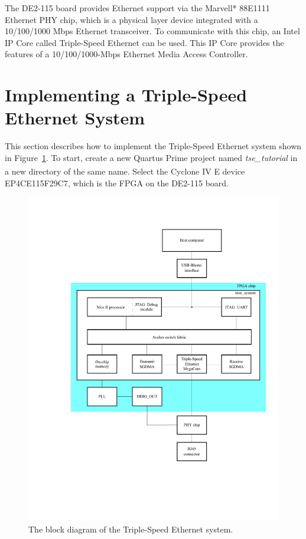 \documentclass[11pt, twoside, pdftex]{article}
\begin{document}
The DE2-115 board provides Ethernet support via the Marvell* 88E1111 Ethernet PHY chip, which is a physical layer device integrated with a 10/100/1000 Mbps Ethernet transceiver. To communicate with this chip, an Intel IP Core called Triple-Speed Ethernet can be used. This IP Core provides the features of a 10/100/1000-Mbps Ethernet Media Access Controller.

\section{Implementing a Triple-Speed Ethernet System}
This section describes how to implement the Triple-Speed Ethernet system shown in Figure~\ref{fig:bigsystem_block_diagram}. To start, create a new Quartus Prime project named {\it tse\_tutorial} in a new directory of the same name. Select the Cyclone\textsuperscript{\textregistered} IV E device {\sf EP4CE115F29C7}, which is the FPGA on the DE2-115 board.

\begin{figure}[H]
	\centering
	  \includegraphics[scale=0.85]{figures/bigsystem_block_diagram.pdf}
	\caption{The block diagram of the Triple-Speed Ethernet system.} 
	\label{fig:bigsystem_block_diagram}
\end{figure}
\end{document}
